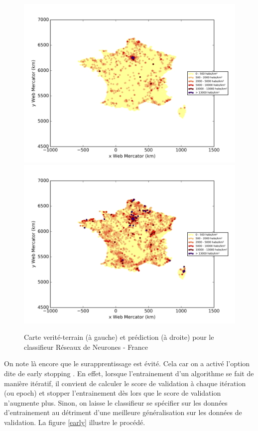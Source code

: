 \documentclass{book}
\begin{document}
\begin{figure}[H]
\centerline{
\includegraphics[scale=0.5]{../../data/France/test/Neural_Network_Classification-oversampling/Neural_Network_Classification-oversampling/density_ground_truth.png}
\includegraphics[scale=0.5]{../../data/France/test/Neural_Network_Classification-oversampling/Neural_Network_Classification-oversampling/density_classification.png}
}
\caption{Carte verité-terrain (à gauche) et prédiction (à droite) pour le classifieur Réseaux de Neurones - France}
\label{nn_carte}
\end{figure}

On note là encore que le surapprentissage est évité. Cela car on a activé l'option dite de \og early stopping \fg{}. En effet, lorsque l'entrainement d'un algorithme se fait de manière itératif, il convient
de calculer le score de validation à chaque itération (ou epoch) et stopper l'entrainement dès lors que le score de validation n'augmente plus. Sinon, on laisse le classifieur se spécifier sur les données d'entrainement
au détriment d'une meilleure généralisation sur les données de validation.
La figure \ref{early} illustre le procédé.
\end{document}
